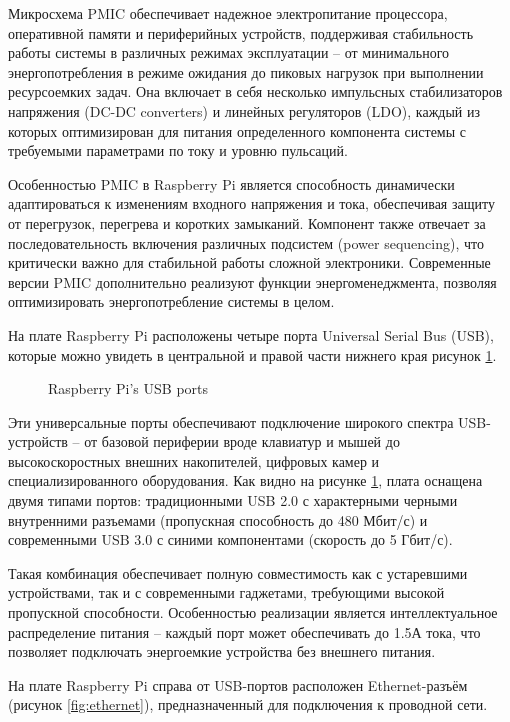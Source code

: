 Микросхема PMIC обеспечивает надежное электропитание процессора, оперативной памяти и периферийных устройств, поддерживая стабильность работы системы в различных режимах эксплуатации -- от минимального энергопотребления в режиме ожидания до пиковых нагрузок при выполнении ресурсоемких задач. Она включает в себя несколько импульсных стабилизаторов напряжения (DC-DC converters) и линейных регуляторов (LDO), каждый из которых оптимизирован для питания определенного компонента системы с требуемыми параметрами по току и уровню пульсаций.

Особенностью PMIC в Raspberry Pi является способность динамически адаптироваться к изменениям входного напряжения и тока, обеспечивая защиту от перегрузок, перегрева и коротких замыканий. Компонент также отвечает за последовательность включения различных подсистем (power sequencing), что критически важно для стабильной работы сложной электроники. Современные версии PMIC дополнительно реализуют функции энергоменеджмента, позволяя оптимизировать энергопотребление системы в целом.

На плате Raspberry Pi расположены четыре порта Universal Serial Bus (USB), которые можно увидеть в центральной и правой части нижнего края рисунок \ref{fig:usb}.

\begin{figure}[H]
	\centering
	\caption{Raspberry Pi's USB ports}
	\label{fig:usb}
\end{figure}

Эти универсальные порты обеспечивают подключение широкого спектра USB-устройств -- от базовой периферии вроде клавиатур и мышей до высокоскоростных внешних накопителей, цифровых камер и специализированного оборудования. Как видно на рисунке \ref{fig:usb}, плата оснащена двумя типами портов: традиционными USB 2.0 с характерными черными внутренними разъемами (пропускная способность до 480 Мбит/с) и современными USB 3.0 с синими компонентами (скорость до 5 Гбит/с).

Такая комбинация обеспечивает полную совместимость как с устаревшими устройствами, так и с современными гаджетами, требующими высокой пропускной способности. Особенностью реализации является интеллектуальное распределение питания -- каждый порт может обеспечивать до 1.5А тока, что позволяет подключать энергоемкие устройства без внешнего питания.

На плате Raspberry Pi справа от USB-портов расположен Ethernet-разъём (рисунок \ref{fig:ethernet}), предназначенный для подключения к проводной сети.

